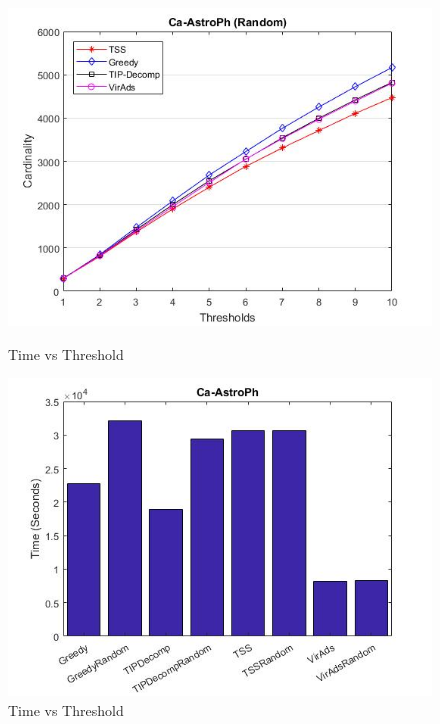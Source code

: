 \begin{figure}[h!]
\begin{minipage}[t]{0.50\textwidth}
\includegraphics[width=\linewidth,keepaspectratio=true]{images/ca-astrophresultrandom.jpg}
\caption{Time vs Threshold}

\end{minipage}
\begin{minipage}[t]{0.50\textwidth}
\includegraphics[width=\linewidth,keepaspectratio=true]{images/astrophtime.jpg}
\caption{Time vs Threshold}
\end{minipage}
\end{figure}

